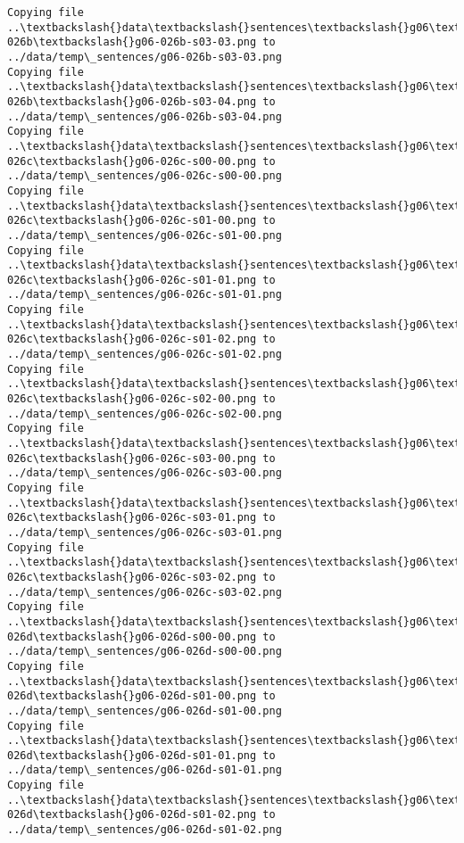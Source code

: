\documentclass[11pt]{article}
\begin{document}
\begin{Verbatim}[commandchars=\\\{\}]
Copying file ..\textbackslash{}data\textbackslash{}sentences\textbackslash{}g06\textbackslash{}g06-026b\textbackslash{}g06-026b-s03-03.png to
../data/temp\_sentences/g06-026b-s03-03.png
Copying file ..\textbackslash{}data\textbackslash{}sentences\textbackslash{}g06\textbackslash{}g06-026b\textbackslash{}g06-026b-s03-04.png to
../data/temp\_sentences/g06-026b-s03-04.png
Copying file ..\textbackslash{}data\textbackslash{}sentences\textbackslash{}g06\textbackslash{}g06-026c\textbackslash{}g06-026c-s00-00.png to
../data/temp\_sentences/g06-026c-s00-00.png
Copying file ..\textbackslash{}data\textbackslash{}sentences\textbackslash{}g06\textbackslash{}g06-026c\textbackslash{}g06-026c-s01-00.png to
../data/temp\_sentences/g06-026c-s01-00.png
Copying file ..\textbackslash{}data\textbackslash{}sentences\textbackslash{}g06\textbackslash{}g06-026c\textbackslash{}g06-026c-s01-01.png to
../data/temp\_sentences/g06-026c-s01-01.png
Copying file ..\textbackslash{}data\textbackslash{}sentences\textbackslash{}g06\textbackslash{}g06-026c\textbackslash{}g06-026c-s01-02.png to
../data/temp\_sentences/g06-026c-s01-02.png
Copying file ..\textbackslash{}data\textbackslash{}sentences\textbackslash{}g06\textbackslash{}g06-026c\textbackslash{}g06-026c-s02-00.png to
../data/temp\_sentences/g06-026c-s02-00.png
Copying file ..\textbackslash{}data\textbackslash{}sentences\textbackslash{}g06\textbackslash{}g06-026c\textbackslash{}g06-026c-s03-00.png to
../data/temp\_sentences/g06-026c-s03-00.png
Copying file ..\textbackslash{}data\textbackslash{}sentences\textbackslash{}g06\textbackslash{}g06-026c\textbackslash{}g06-026c-s03-01.png to
../data/temp\_sentences/g06-026c-s03-01.png
Copying file ..\textbackslash{}data\textbackslash{}sentences\textbackslash{}g06\textbackslash{}g06-026c\textbackslash{}g06-026c-s03-02.png to
../data/temp\_sentences/g06-026c-s03-02.png
Copying file ..\textbackslash{}data\textbackslash{}sentences\textbackslash{}g06\textbackslash{}g06-026d\textbackslash{}g06-026d-s00-00.png to
../data/temp\_sentences/g06-026d-s00-00.png
Copying file ..\textbackslash{}data\textbackslash{}sentences\textbackslash{}g06\textbackslash{}g06-026d\textbackslash{}g06-026d-s01-00.png to
../data/temp\_sentences/g06-026d-s01-00.png
Copying file ..\textbackslash{}data\textbackslash{}sentences\textbackslash{}g06\textbackslash{}g06-026d\textbackslash{}g06-026d-s01-01.png to
../data/temp\_sentences/g06-026d-s01-01.png
Copying file ..\textbackslash{}data\textbackslash{}sentences\textbackslash{}g06\textbackslash{}g06-026d\textbackslash{}g06-026d-s01-02.png to
../data/temp\_sentences/g06-026d-s01-02.png

\end{Verbatim}
\end{document}
